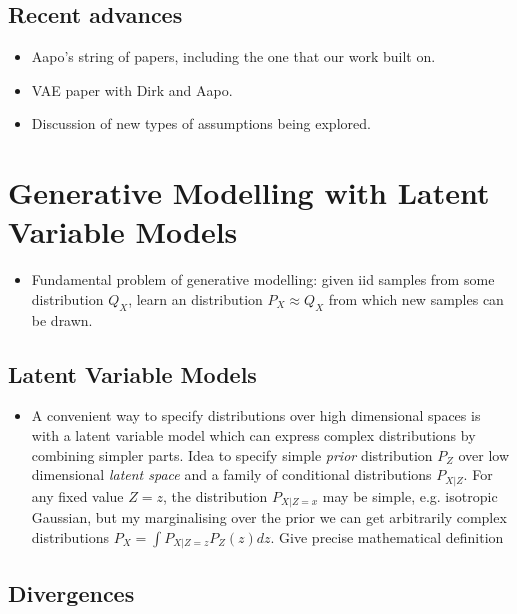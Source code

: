 \subsection{Recent advances}
\begin{itemize}
\item Aapo's string of papers, including the one that our work built on.
\item VAE paper with Dirk and Aapo.
\item Discussion of new types of assumptions being explored.
\end{itemize}




\section{Generative Modelling with Latent Variable Models}


\begin{itemize}
\item Fundamental problem of generative modelling: given iid samples from some distribution $Q_X$, learn an distribution $P_X \approx Q_X$ from which new samples can be drawn. 
\end{itemize}


\subsection{Latent Variable Models}

\begin{itemize}
\item A convenient way to specify distributions over high dimensional spaces is with a latent variable model which can express complex distributions by combining simpler parts. Idea to specify simple \emph{prior} distribution $P_Z$ over low dimensional \emph{latent space} and a family of conditional distributions $P_{X|Z}$. For any fixed value $Z=z$, the distribution $P_{X|Z=x}$ may be simple, e.g. isotropic Gaussian, but my marginalising over the prior we can get arbitrarily complex distributions $P_X = \int P_{X|Z=z} P_Z(z) dz$. Give precise mathematical definition
\end{itemize}


\subsection{Divergences}

